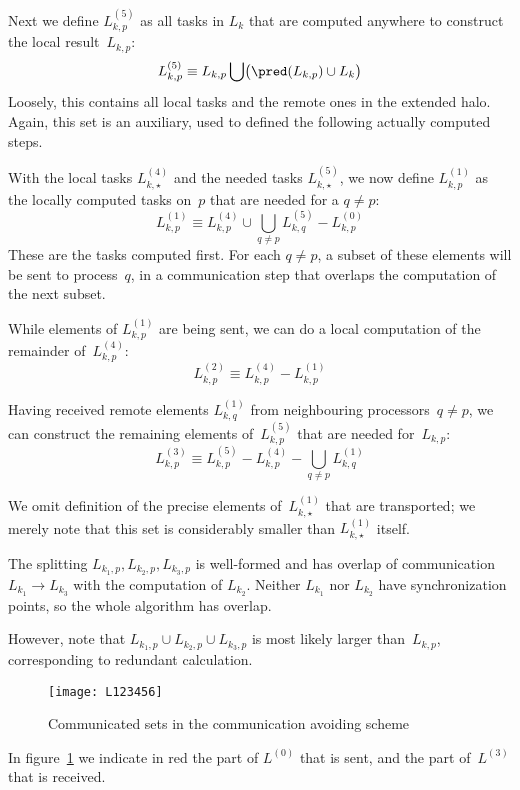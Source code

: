 
Next we define $L^{(5)}_{k,p}$ as all tasks in $L_k$
that are computed anywhere to construct the local result~$L_{k,p}$:
\[
    L^{(5)}_{k,p} \equiv
    L_{k,p} \bigcup \bigl( \pred(L_{k,p})\cup L_k \bigr)
\]
Loosely, this contains all local tasks and the remote ones in the
extended halo. Again, this set is an auxiliary, used to defined the
following actually computed steps.


With the local tasks $L^{(4)}_{k,\star}$ and the needed tasks
$L^{(5)}_{k,\star}$, we now define $L^{(1)}_{k,p}$ as the locally
computed tasks on~$p$ that are needed for a $q\not=p$:
\[
    L^{(1)}_{k,p}\equiv
    L^{(4)}_{k,p} \cup \bigcup_{q\not=p} L^{(5)}_{k,q}
    - L^{(0)}_{k,p}
\]
These are the tasks computed first. For each $q\not=p$, a subset of
these elements will be sent to process~$q$, in a communication step
that overlaps the computation of the next subset.


While elements of $L^{(1)}_{k,p}$ are being sent, we can do a local
computation of the remainder of~$L^{(4)}_{k,p}$:
\[
    L^{(2)}_{k,p} \equiv L^{(4)}_{k,p} - L^{(1)}_{k,p}
\]


Having received remote elements $L^{(1)}_{k,q}$ from neighbouring
processors~$q\not=p$, we can construct the remaining elements
of~$L^{(5)}_{k,p}$ that are needed for~$L_{k,p}$:
\[
    L^{(3)}_{k,p} \equiv
    L^{(5)}_{k,p} - L^{(4)}_{k,p} - \bigcup_{q\not=p} L^{(1)}_{k,q}
\]

We omit definition of the precise elements of~$L^{(1)}_{k,\star}$ that
are transported; we merely note that this set is considerably smaller
than $L^{(1)}_{k,\star}$ itself.

\begin{theorem}
  The splitting $L_{k_1,p},L_{k_2,p},L_{k_3,p}$ is well-formed and has overlap
  of communication $L_{k_1}\rightarrow L_{k_3}$ with the computation of $L_{k_2}$.
  Neither $L_{k_1}$ nor $L_{k_2}$ have synchronization points, so the whole algorithm
  has overlap.
\end{theorem}

However, note that $L_{k_1,p}\cup L_{k_2,p}\cup L_{k_3,p}$ is most
likely larger than~$L_{k,p}$,
corresponding to redundant calculation.


\begin{figure}[ht]
  \texttt{[image: L123456]}
  \caption{Communicated sets in the communication avoiding scheme}
  \label{fig:avoid-comm}
\end{figure}

In figure~\ref{fig:avoid-comm} we indicate in red the part of
$L^{(0)}$ that is sent, and the part of~$L^{(3)}$ that is received.
